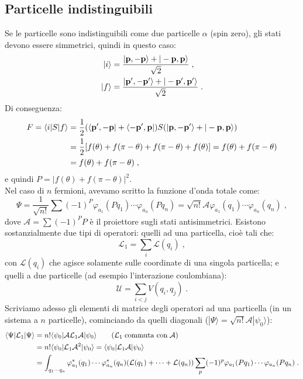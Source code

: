 \documentclass[12pt,a4paper]{report}
\theoremstyle{definition}
\newcommand{\lag}{\mathcal{L}}
\numberwithin{equation}{section}
\newcommand{\bra}{\langle}
\newcommand{\ket}{\rangle}
\begin{document}
\subsection{Particelle indistinguibili}
Se le particelle sono indistinguibili come due particelle $\alpha$ (spin zero), gli stati devono essere simmetrici, quindi in questo caso:
\begin{align}
|i\ket &= \frac{|\mathbf{p},-\mathbf{p}\ket+|-\mathbf{p},\mathbf{p}\ket}{\sqrt{2}}\;, \notag \\
|f\ket &= \frac{|\mathbf{p}',-\mathbf{p}'\ket+|-\mathbf{p}',\mathbf{p}'\ket}{\sqrt{2}}\;.
\end{align}
Di conseguenza:
\begin{align}
F = \bra i|S|f\ket &= \frac{1}{2}(\bra\mathbf{p}',-\mathbf{p}|+\bra -\mathbf{p}',\mathbf{p}|)S(|\mathbf{p},-\mathbf{p}'\ket+|-\mathbf{p},\mathbf{p}\ket) \notag \\
&=\frac{1}{2}[f(\theta)+f(\pi-\theta)+f(\pi-\theta)+f(\theta)]=f(\theta)+f(\pi-\theta)  \notag \\
&= f(\theta)+f(\pi-\theta)\;,
\end{align}
e quindi $P=|f(\theta)+f(\pi-\theta)|^2$. \\
Nel caso di $n$ fermioni, avevamo scritto la funzione d'onda totale come:
$$
\Psi=\frac{1}{\sqrt{n!}}\sum (-1)^P\varphi_{a_1}(Pq_1)\cdots\varphi_{a_n}(Pq_n)=\sqrt{n!}\mathcal{A}\varphi_{a_1}(q_1)\cdots\varphi_{a_n}(q_n)\;,
$$
dove $\mathcal{A}=\sum (-1)^PP$ è il proiettore sugli stati antisimmetrici. Esistono sostanzialmente due tipi di operatori: quelli ad una particella, cioè tali che:
\begin{equation}
\lag_1=\sum_i\lag(q_i)\;,
\end{equation}
con $\lag(q_i)$ che agisce solamente sulle coordinate di una singola particella; e quelli a due particelle (ad esempio l'interazione coulombiana):
\begin{equation}
\mathcal{U}=\sum_{i<j}V(q_i,q_j)\;.
\end{equation}
Scriviamo adesso gli elementi di matrice degli operatori ad una particella (in un sistema a $n$ particelle), cominciando da quelli diagonali ($|\Psi\ket=\sqrt{n!}\mathcal{A}|\psi_0\ket$):
\begin{align}
\bra\Psi|\lag_1|\Psi\ket &= n!\bra \psi_0|\mathcal{A}\lag_1\mathcal{A}|\psi_0\ket \qquad (\lag_1\;\mbox{commuta con}\;\mathcal{A}) \notag \\
&= n!\bra\psi_0|\lag_1\mathcal{A}^2|\psi_0\ket=\bra\psi_0|\lag_1\mathcal{A}|\psi_0\ket \notag \\
&= \int_{q_1\cdots q_n} \varphi_{a_1}^*(q_1)\cdots\varphi_{a_n}^*(q_n)(\lag(q_1)+\cdots+\lag(q_n))\sum_p(-1)^p\varphi_{a_1}(Pq_1)\cdots\varphi_{a_n}(Pq_n)\;.
\end{align}
\end{document}
